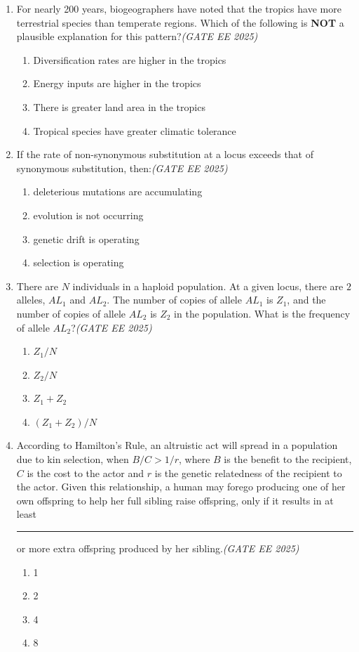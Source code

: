 \documentclass[11pt,a4paper]{article}
\begin{document}
\begin{enumerate}[leftmargin=*,label=\textbf{Q.\arabic*},resume]

\item For nearly 200 years, biogeographers have noted that the tropics have more terrestrial species than temperate regions. Which of the following is \textbf{NOT} a plausible explanation for this pattern?\hfill \textit{(GATE EE 2025)}
\begin{enumerate}[label=(\Alph*)]
\item Diversification rates are higher in the tropics
\item Energy inputs are higher in the tropics
\item There is greater land area in the tropics
\item Tropical species have greater climatic tolerance
\end{enumerate}

\item If the rate of non-synonymous substitution at a locus exceeds that of synonymous substitution, then:\hfill \textit{(GATE EE 2025)}
\begin{enumerate}[label=(\Alph*)]
\item deleterious mutations are accumulating
\item evolution is not occurring
\item genetic drift is operating
\item selection is operating
\end{enumerate}

\item There are $N$ individuals in a haploid population. At a given locus, there are $2$ alleles, $AL_1$ and $AL_2$. The number of copies of allele $AL_1$ is $Z_1$, and the number of copies of allele $AL_2$ is $Z_2$ in the population. What is the frequency of allele $AL_2$?\hfill \textit{(GATE EE 2025)}
\begin{enumerate}[label=(\Alph*)]
\item $Z_1/N$
\item $Z_2/N$
\item $Z_1 + Z_2$
\item $(Z_1 + Z_2)/N$
\end{enumerate}

\item According to Hamilton's Rule, an altruistic act will spread in a population due to kin selection, when $B/C > 1/r$, where $B$ is the benefit to the recipient, $C$ is the cost to the actor and $r$ is the genetic relatedness of the recipient to the actor. Given this relationship, a human may forego producing one of her own offspring to help her full sibling raise offspring, only if it results in at least \rule{2cm}{0.15mm} or more extra offspring produced by her sibling.\hfill \textit{(GATE EE 2025)}
\begin{enumerate}[label=(\Alph*)]
\item 1
\item 2
\item 4
\item 8
\end{enumerate}


\end{enumerate}
\end{document}
